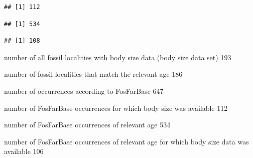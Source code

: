 \documentclass[]{article}
\newenvironment{Shaded}{\begin{snugshade}}{\end{snugshade}}
\newcommand{\KeywordTok}[1]{\textcolor[rgb]{0.13,0.29,0.53}{\textbf{{#1}}}}
\newcommand{\DecValTok}[1]{\textcolor[rgb]{0.00,0.00,0.81}{{#1}}}
\newcommand{\FloatTok}[1]{\textcolor[rgb]{0.00,0.00,0.81}{{#1}}}
\newcommand{\StringTok}[1]{\textcolor[rgb]{0.31,0.60,0.02}{{#1}}}
\newcommand{\NormalTok}[1]{{#1}}
\begin{document}
\begin{Shaded}
\end{Shaded}

\begin{verbatim}
## [1] 112
\end{verbatim}

\begin{Shaded}
\end{Shaded}

\begin{verbatim}
## [1] 534
\end{verbatim}

\begin{Shaded}
\end{Shaded}

\begin{verbatim}
## [1] 108
\end{verbatim}

number of all fossil localities with body size data (body size data set)
193

number of fossil localities that match the relevant age 186

number of occurrences according to FosFarBase 647

number of FosFarBase occurrences for which body size was available 112

number of FosFarBase occurrences of relevant age 534

number of FosFarBase occurrences of relevant age for which body size
data was available 106
\end{document}
